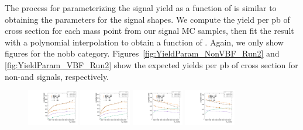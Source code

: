 The process for parameterizing the signal yield as a function of \MX is similar to obtaining the parameters for the signal shapes.
We compute the yield per pb of cross section for each mass point from our signal MC samples, then fit the result with a polynomial interpolation to obtain a function of \MX.
Again, we only show figures for the nobb category.
Figures~\ref{fig:YieldParam_NonVBF_Run2} and \ref{fig:YieldParam_VBF_Run2} show the expected yields per pb of cross section for non-\VBF and \VBF signals, respectively.

\begin{figure}[htbp]
  \centering
  \includegraphics[width=0.2\textwidth]{fig/2Dfit/paramSignalYield_NonVBFSig_mu_HP_nobb_LDy.pdf}
  \includegraphics[width=0.2\textwidth]{fig/2Dfit/paramSignalYield_NonVBFSig_e_HP_nobb_LDy.pdf}
  \includegraphics[width=0.2\textwidth]{fig/2Dfit/paramSignalYield_NonVBFSig_mu_LP_nobb_LDy.pdf}
  \includegraphics[width=0.2\textwidth]{fig/2Dfit/paramSignalYield_NonVBFSig_e_LP_nobb_LDy.pdf}\\

\end{figure}
